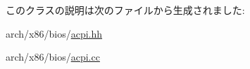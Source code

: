 このクラスの説明は次のファイルから生成されました:\begin{DoxyCompactItemize}
\item 
arch/x86/bios/\hyperlink{acpi_8hh}{acpi.hh}\item 
arch/x86/bios/\hyperlink{acpi_8cc}{acpi.cc}\end{DoxyCompactItemize}
